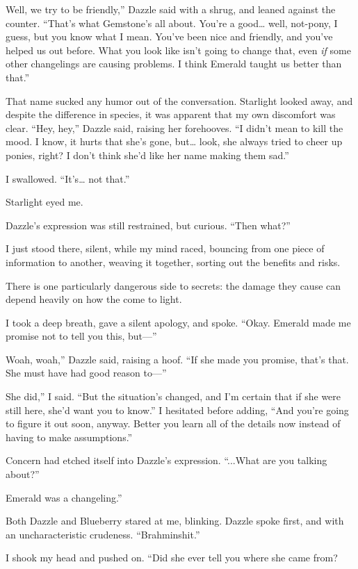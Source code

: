 \leavevmode{}Well, we try to be friendly,” Dazzle said with a shrug, and leaned against the counter. “That’s what Gemstone’s all about. You’re a good… well, not-pony, I guess, but you know what I mean. You’ve been nice and friendly, and you’ve helped us out before. What you look like isn’t going to change that, even \textit{if} some other changelings are causing problems. I think Emerald taught us better than that.”

That name sucked any humor out of the conversation. Starlight looked away, and despite the difference in species, it was apparent that my own discomfort was clear. “Hey, hey,” Dazzle said, raising her forehooves. “I didn’t mean to kill the mood. I know, it hurts that she’s gone, but… look, she always tried to cheer up ponies, right? I don’t think she’d like her name making them sad.”

I swallowed. “It’s… not that.”

Starlight eyed me.

Dazzle’s expression was still restrained, but curious. “Then what?”

I just stood there, silent, while my mind raced, bouncing from one piece of information to another, weaving it together, sorting out the benefits and risks.

There is one particularly dangerous side to secrets: the damage they cause can depend heavily on how the come to light.

I took a deep breath, gave a silent apology, and spoke. “Okay. Emerald made me promise not to tell you this, but—”

\leavevmode{}Woah, woah,” Dazzle said, raising a hoof. “If she made you promise, that’s that. She must have had good reason to—”

\leavevmode{}She did,” I said. “But the situation’s changed, and I’m certain that if she were still here, she’d want you to know.” I hesitated before adding, “And you’re going to figure it out soon, anyway. Better you learn all of the details now instead of having to make assumptions.”

Concern had etched itself into Dazzle’s expression. “...What are you talking about?”

\leavevmode{}Emerald was a changeling.”

Both Dazzle and Blueberry stared at me, blinking. Dazzle spoke first, and with an uncharacteristic crudeness. “Brahminshit.”

I shook my head and pushed on. “Did she ever tell you where she came from?

